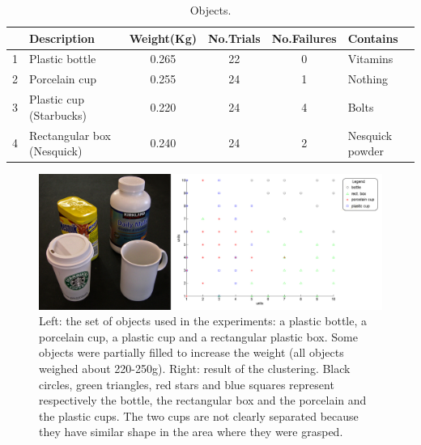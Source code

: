 \begin{table}[htb]
  \caption{Objects.} \label{tab:objects} \centering
  \begin{tabular}{|c|l|c|c|c|l|}
    \hline
    &Description& Weight(Kg)&No.Trials&No.Failures&Contains \\
    \hline
    1&Plastic bottle        & 0.265 & 22& 0 & Vitamins\\
    2&Porcelain cup & 0.255 & 24& 1 & Nothing\\
    3&Plastic cup (Starbucks)      & 0.220 & 24& 4 & Bolts \\
    4&Rectangular box (Nesquick)        & 0.240 & 24& 2 & Nesquick powder\\

    \hline
  \end{tabular}
\end{table}

\begin{figure}[tbp]
\centerline{
\includegraphics[width=6.0in]{./figures/objects-clusters2.eps}
}\caption[Objects grabbed and clustering]{Left: the set of objects
used in the experiments: a plastic bottle, a porcelain cup, a
plastic cup and a rectangular plastic box. Some objects were
partially filled to increase the weight (all objects weighed about
220-250g). Right: result of the clustering. Black circles, green
triangles, red stars and blue squares represent respectively the
bottle, the rectangular box and the porcelain and the plastic
cups. The two cups are not clearly separated because they have
similar shape in the area where they were grasped.}
\label{fig:Objects}
\end{figure}


